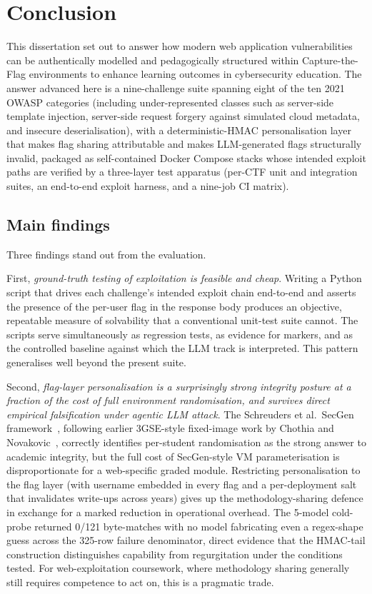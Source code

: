 \section{Conclusion}
\label{sec:conclusion}

This dissertation set out to answer how modern web application
vulnerabilities can be authentically modelled and pedagogically
structured within Capture-the-Flag environments to enhance
learning outcomes in cybersecurity education. The answer advanced
here is a nine-challenge suite spanning eight of the ten
2021 OWASP categories (including under-represented classes
such as server-side template injection, server-side request
forgery against simulated cloud metadata, and insecure
deserialisation), with a deterministic-HMAC personalisation
layer that makes flag sharing attributable and makes
LLM-generated flags structurally invalid, packaged as
self-contained Docker Compose stacks whose intended exploit
paths are verified by a three-layer test apparatus (per-CTF
unit and integration suites, an end-to-end exploit harness,
and a nine-job CI matrix).

\subsection{Main findings}

Three findings stand out from the evaluation.

First, \textit{ground-truth testing of exploitation is feasible and
cheap}. Writing a Python script that drives each challenge's
intended exploit chain end-to-end and asserts the presence of the
per-user flag in the response body produces an objective,
repeatable measure of solvability that a conventional unit-test
suite cannot. The scripts serve simultaneously as regression
tests, as evidence for markers, and as the controlled baseline
against which the LLM track is interpreted. This pattern
generalises well beyond the present suite.

Second, \textit{flag-layer personalisation is a surprisingly strong
integrity posture at a fraction of the cost of full environment
randomisation, and survives direct empirical falsification under
agentic LLM attack}. The Schreuders et al.\ SecGen
framework~\cite{secgen2017}, following earlier 3GSE-style
fixed-image work by Chothia and Novakovic~\cite{chothia2015},
correctly identifies per-student randomisation as the strong
answer to academic integrity, but the full cost of SecGen-style
VM parameterisation is disproportionate for a web-specific
graded module. Restricting personalisation to
the flag layer (with username embedded in every flag and a
per-deployment salt that invalidates write-ups across years) gives
up the methodology-sharing defence in exchange for a marked
reduction in operational overhead. The 5-model cold-probe
returned 0/121 byte-matches with no model fabricating even a
regex-shape guess across the 325-row failure denominator,
direct evidence that the HMAC-tail construction distinguishes
capability from regurgitation under the conditions tested. For
web-exploitation coursework, where methodology sharing
generally still requires competence to act on, this is a
pragmatic trade.

